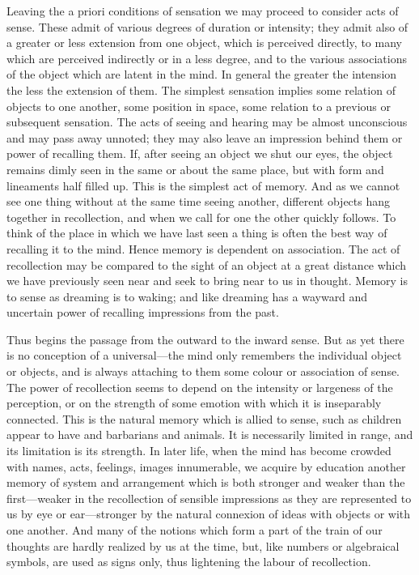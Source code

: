 \documentclass[11pt,letter]{article}
\begin{document}
\par  Leaving the a priori conditions of sensation we may proceed to consider acts of sense. These admit of various degrees of duration or intensity; they admit also of a greater or less extension from one object, which is perceived directly, to many which are perceived indirectly or in a less degree, and to the various associations of the object which are latent in the mind. In general the greater the intension the less the extension of them. The simplest sensation implies some relation of objects to one another, some position in space, some relation to a previous or subsequent sensation. The acts of seeing and hearing may be almost unconscious and may pass away unnoted; they may also leave an impression behind them or power of recalling them. If, after seeing an object we shut our eyes, the object remains dimly seen in the same or about the same place, but with form and lineaments half filled up. This is the simplest act of memory. And as we cannot see one thing without at the same time seeing another, different objects hang together in recollection, and when we call for one the other quickly follows. To think of the place in which we have last seen a thing is often the best way of recalling it to the mind. Hence memory is dependent on association. The act of recollection may be compared to the sight of an object at a great distance which we have previously seen near and seek to bring near to us in thought. Memory is to sense as dreaming is to waking; and like dreaming has a wayward and uncertain power of recalling impressions from the past.

\par  Thus begins the passage from the outward to the inward sense. But as yet there is no conception of a universal—the mind only remembers the individual object or objects, and is always attaching to them some colour or association of sense. The power of recollection seems to depend on the intensity or largeness of the perception, or on the strength of some emotion with which it is inseparably connected. This is the natural memory which is allied to sense, such as children appear to have and barbarians and animals. It is necessarily limited in range, and its limitation is its strength. In later life, when the mind has become crowded with names, acts, feelings, images innumerable, we acquire by education another memory of system and arrangement which is both stronger and weaker than the first—weaker in the recollection of sensible impressions as they are represented to us by eye or ear—stronger by the natural connexion of ideas with objects or with one another. And many of the notions which form a part of the train of our thoughts are hardly realized by us at the time, but, like numbers or algebraical symbols, are used as signs only, thus lightening the labour of recollection.
\end{document}
